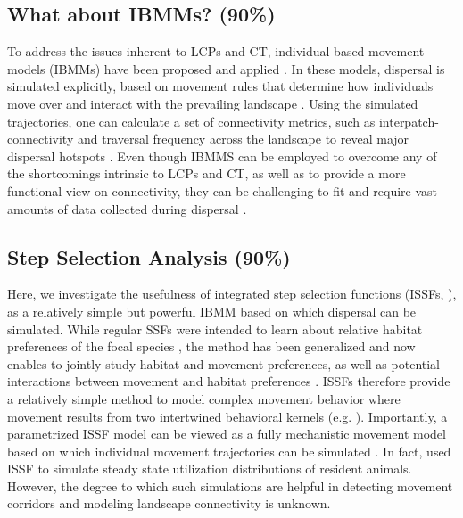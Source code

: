 \documentclass[abstract=on,10pt,a4paper,bibliography=totocnumbered]{article}
\begin{document}
\subsection{What about IBMMs? (90\%)}
To address the issues inherent to LCPs and CT, individual-based movement models
(IBMMs) have been proposed and applied \citep{Diniz.2020}. In these models,
dispersal is simulated explicitly, based on movement rules that determine how
individuals move over and interact with the prevailing landscape
\citep{Kanagaraj.2013, Clark.2015, Allen.2016, Hauenstein.2019, Zeller.2020,
Vasudev.2021}. Using the simulated trajectories, one can calculate a set of
connectivity metrics, such as interpatch-connectivity and traversal frequency
across the landscape to reveal major dispersal hotspots \citep{Kanagaraj.2013,
BastilleRousseau.2018, Hauenstein.2019, Zeller.2020}. Even though IBMMS can be
employed to overcome any of the shortcomings intrinsic to LCPs and CT, as well
as to provide a more functional view on connectivity, they can be challenging to
fit and require vast amounts of data collected during dispersal
\citep{Diniz.2020}.

\subsection{Step Selection Analysis (90\%)}
Here, we investigate the usefulness of integrated step selection functions
(ISSFs, \citealp{Avgar.2016}), as a relatively simple but powerful IBMM based on
which dispersal can be simulated. While regular SSFs were intended to learn
about relative habitat preferences of the focal species \citep{Fortin.2005,
Thurfjell.2014, Avgar.2017}, the method has been generalized and now enables to
jointly study habitat and movement preferences, as well as potential
interactions between movement and habitat preferences \citep{Avgar.2016,
Signer.2017, Fieberg.2020}. ISSFs therefore provide a relatively simple method
to model complex movement behavior where movement results from two intertwined
behavioral kernels (e.g. \citealp{Prokopenko.2017, Munden.2020}). Importantly, a
parametrized ISSF model can be viewed as a fully mechanistic movement model
based on which individual movement trajectories can be simulated
\citep{Avgar.2016, Signer.2017}. In fact, \cite{Signer.2017} used ISSF to
simulate steady state utilization distributions of resident animals. However,
the degree to which such simulations are helpful in detecting movement corridors
and modeling landscape connectivity is unknown.
\end{document}
